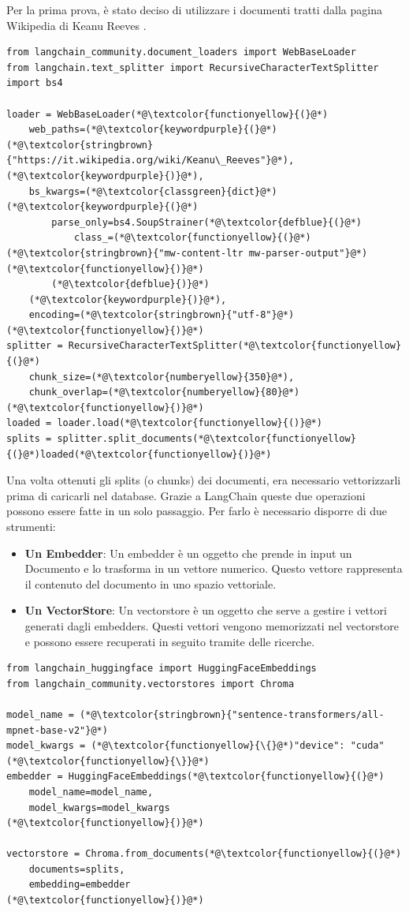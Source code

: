 Per la prima prova, è stato deciso di utilizzare i documenti tratti dalla pagina Wikipedia di Keanu Reeves \cite{keanureeveswiki}.
\begin{lstlisting}[label=lst:keanusplits, caption={Preparazione degli splits dei documenti di Keanu Reeves}]
from langchain_community.document_loaders import WebBaseLoader
from langchain.text_splitter import RecursiveCharacterTextSplitter
import bs4

loader = WebBaseLoader(*@\textcolor{functionyellow}{(}@*)
    web_paths=(*@\textcolor{keywordpurple}{(}@*)(*@\textcolor{stringbrown}{"https://it.wikipedia.org/wiki/Keanu\_Reeves"}@*),(*@\textcolor{keywordpurple}{)}@*),
    bs_kwargs=(*@\textcolor{classgreen}{dict}@*)(*@\textcolor{keywordpurple}{(}@*)
        parse_only=bs4.SoupStrainer(*@\textcolor{defblue}{(}@*)
            class_=(*@\textcolor{functionyellow}{(}@*)(*@\textcolor{stringbrown}{"mw-content-ltr mw-parser-output"}@*)(*@\textcolor{functionyellow}{)}@*)
        (*@\textcolor{defblue}{)}@*)
    (*@\textcolor{keywordpurple}{)}@*),
    encoding=(*@\textcolor{stringbrown}{"utf-8"}@*)
(*@\textcolor{functionyellow}{)}@*)
splitter = RecursiveCharacterTextSplitter(*@\textcolor{functionyellow}{(}@*)
    chunk_size=(*@\textcolor{numberyellow}{350}@*),
    chunk_overlap=(*@\textcolor{numberyellow}{80}@*)
(*@\textcolor{functionyellow}{)}@*)
loaded = loader.load(*@\textcolor{functionyellow}{()}@*)
splits = splitter.split_documents(*@\textcolor{functionyellow}{(}@*)loaded(*@\textcolor{functionyellow}{)}@*)
\end{lstlisting}
Una volta ottenuti gli splits (o chunks) dei documenti, era necessario vettorizzarli prima di caricarli nel database. Grazie a LangChain queste due operazioni possono essere fatte in un solo passaggio. Per farlo è necessario disporre di due strumenti:
\begin{itemize}
    \item \textbf{Un Embedder}: Un embedder è un oggetto che prende in input un Documento e lo trasforma in un vettore numerico. Questo vettore rappresenta il contenuto del documento in uno spazio vettoriale.
    \item \textbf{Un VectorStore}: Un vectorstore è un oggetto che serve a gestire i vettori generati dagli embedders. Questi vettori vengono memorizzati nel vectorstore e possono essere recuperati in seguito tramite delle ricerche.
\end{itemize}
\begin{lstlisting}[label=lst:keanuload, caption={Caricamento degli splits sul vectorstore}]
from langchain_huggingface import HuggingFaceEmbeddings
from langchain_community.vectorstores import Chroma

model_name = (*@\textcolor{stringbrown}{"sentence-transformers/all-mpnet-base-v2"}@*)
model_kwargs = (*@\textcolor{functionyellow}{\{}@*)"device": "cuda"(*@\textcolor{functionyellow}{\}}@*)
embedder = HuggingFaceEmbeddings(*@\textcolor{functionyellow}{(}@*)
    model_name=model_name,
    model_kwargs=model_kwargs
(*@\textcolor{functionyellow}{)}@*)

vectorstore = Chroma.from_documents(*@\textcolor{functionyellow}{(}@*)
    documents=splits,
    embedding=embedder
(*@\textcolor{functionyellow}{)}@*)
\end{lstlisting}
